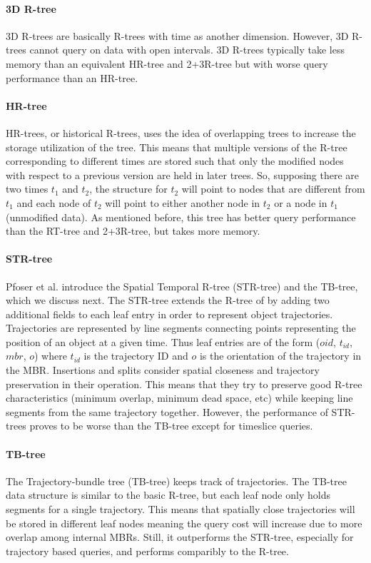 \paragraph{3D R-tree} 3D R-trees \cite{nascimento1999evaluation} are basically
R-trees with time as another dimension. However, 3D R-trees cannot 
query on data with open intervals. 3D R-trees typically take less
memory than an equivalent HR-tree and 2+3R-tree but with worse query 
performance than an HR-tree.

\paragraph{HR-tree} HR-trees, or historical R-trees, 
\cite{nascimento1999evaluation} uses the idea of overlapping trees to 
increase the storage utilization of the tree. This means that multiple 
versions of the R-tree corresponding to different times are stored such 
that only the modified nodes with respect to a previous version are 
held in later trees. So, supposing there are two times $t_1$ and $t_2$, the
structure for $t_2$ will point to nodes that are different from $t_1$ and
each node of $t_2$ will point to either another node in $t_2$ or a node in
$t_1$ (unmodified data). As mentioned before, this tree has better query
performance than the RT-tree and 2+3R-tree, but takes more memory.

\paragraph{STR-tree} Pfoser et al. introduce the Spatial Temporal R-tree 
(STR-tree) and the TB-tree, which we discuss next\cite{pfoser2000novel}. 
The STR-tree extends the R-tree of \cite{guttman84} by adding two additional
fields to each leaf entry in order to represent object trajectories. 
Trajectories are represented by line segments connecting points representing
the position of an object at a given time. Thus leaf entries are of the 
form ($oid$, $t_{id}$, $mbr$, $o$) where $t_{id}$ is the trajectory ID and 
$o$ is the orientation of the trajectory in the MBR. Insertions and splits 
consider spatial closeness and trajectory preservation in their operation.
This means that they try to preserve good R-tree characteristics (minimum 
overlap, minimum dead space, etc) while keeping line segments from the 
same trajectory together. However, the performance of STR-trees proves to
be worse than the TB-tree except for timeslice queries.

\paragraph{TB-tree} The Trajectory-bundle tree (TB-tree) \cite{pfoser2000novel}
keeps track of trajectories. The TB-tree data structure is similar to the 
basic R-tree, but each leaf node only holds segments for a single 
trajectory. This means that spatially close trajectories will be stored in 
different leaf nodes meaning the query cost will increase due to more 
overlap among internal MBRs. Still, it outperforms the STR-tree, especially
for trajectory based queries, and performs comparibly to the R-tree. 

